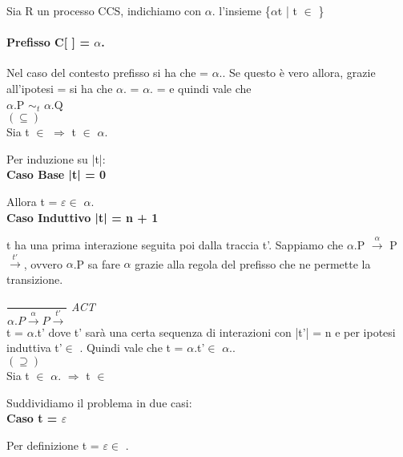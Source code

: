 Sia R un processo CCS, indichiamo con $\alpha$. l'insieme \{$\alpha$t | t $\in$ \}

\paragraph{Prefisso C[ ] = $\alpha$.} \mbox{}

Nel caso del contesto prefisso si ha che  = $\alpha$..
Se questo è vero allora, grazie all'ipotesi  =  si ha che  $\alpha$. =  $\alpha$. =  e quindi vale che\\ $\alpha$.P $\sim_{t}$ $\alpha$.Q\\

$(\subseteq)$ \\

Sia  t $\in$  $\Rightarrow$  t $\in$ $\alpha$.

Per induzione su |t|:
\\

\textbf{Caso Base |t| = 0}

Allora t = $\varepsilon \in$ $ \alpha$.
\\

\pagebreak
\textbf{Caso Induttivo |t| = n + 1}

t ha una prima interazione seguita poi dalla traccia t'. Sappiamo che $\alpha.$P $\overset{\alpha}\rightarrow $ P $\overset{t'}\rightarrow$, ovvero $\alpha$.P sa fare $\alpha$ grazie alla regola del prefisso che ne permette la transizione.

	$\dfrac{}{\alpha.P \overset{\alpha}\rightarrow P\overset{t'}\rightarrow}$ \textit{ACT} \\
	
t = $\alpha$.t' dove t' sarà una certa sequenza di interazioni con |t'| = n e per ipotesi induttiva t'$\in$ . Quindi vale che t = $\alpha$.t'$\in$ $\alpha$..\\

$(\supseteq)$ \\

Sia  t $\in$ $\alpha$. $\Rightarrow$  t $\in$ 

Suddividiamo il problema in due casi:
\\

\textbf{Caso t = $\varepsilon$}

Per definizione t = $\varepsilon \in $ .
\\
 
